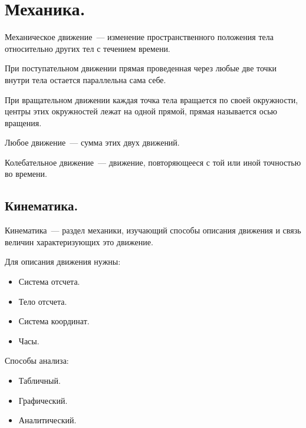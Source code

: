 \documentclass[12pt]{article}
\begin{document}
	\tableofcontents
	\setcounter{tocdepth}{3}
	\newpage
	\section{Механика.}
	\begin{definition}
		Механическое движение~--- изменение пространственного положения тела относительно других тел с течением времени.
	\end{definition}
	\begin{definition}
		При поступательном движении прямая проведенная через любые две точки внутри тела остается параллельна сама себе.
	\end{definition}
	\begin{definition}
		При вращательном движении каждая точка тела вращается по своей окружности, центры этих окружностей лежат на одной прямой, прямая называется осью вращения.
	\end{definition}
	\begin{statement}
		Любое движение~--- сумма этих двух движений.
	\end{statement}
	\begin{definition}
		Колебательное движение~--- движение, повторяющееся с той или иной точностью во времени.
	\end{definition}
	\subsection{Кинематика.}
	\begin{definition}
		Кинематика~--- раздел механики, изучающий способы описания движения и связь величин характеризующих это движение.
	\end{definition}
	\begin{statement}
		Для описания движения нужны:
		\begin{itemize}
			\item Система отсчета.
			\item Тело отсчета.
			\item Система координат.
			\item Часы.
		\end{itemize}
	\end{statement}
	\begin{statement}
		Способы анализа:
		\begin{itemize}
			\item Табличный.
			\item Графический.
			\item Аналитический.
		\end{itemize}
	\end{statement}
\end{document}
